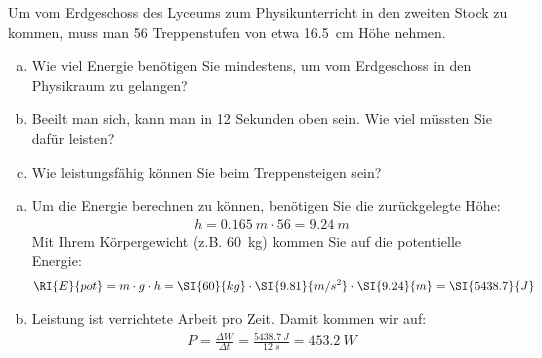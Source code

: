 
\begin{aufgabe}
	Um vom Erdgeschoss des Lyceums zum Physikunterricht in den zweiten Stock zu kommen, muss man
	56 Treppenstufen von etwa \SI{16.5}{cm} Höhe nehmen.
	\begin{enumerate} [a)]
		\item Wie viel Energie benötigen Sie mindestens, um vom Erdgeschoss in den Physikraum zu gelangen?
		\item Beeilt man sich, kann man in 12 Sekunden oben sein. Wie viel müssten Sie dafür leisten?
		\item Wie leistungsfähig können Sie beim Treppensteigen sein?
	\end{enumerate}
	\begin{loesung}
		\begin{enumerate} [a)]
			\item Um die Energie berechnen zu können, benötigen Sie die zurückgelegte Höhe: 
		\begin{eqnarray*}
			h=\SI{0.165}{m}\cdot 56 =\SI{9.24}{m}
		\end{eqnarray*}
		Mit Ihrem Körpergewicht (z.B. \SI{60}{kg}) kommen Sie auf die potentielle Energie:
		\begin{eqnarray*}
			\RI{E}{pot}=m\cdot g\cdot h=\SI{60}{kg}\cdot\SI{9.81}{m/s^2}\cdot\SI{9.24}{m}=\SI{5438.7}{J}
		\end{eqnarray*}
	\item Leistung ist verrichtete Arbeit pro Zeit. Damit kommen wir auf:
		\begin{eqnarray*}
			P=\frac{\Delta W}{\Delta t}=\frac{\SI{5438.7}{J}}{\SI{12}{s}}=\SI{453.2}{W}
		\end{eqnarray*}
		\end{enumerate}
	\end{loesung}
\end{aufgabe}
